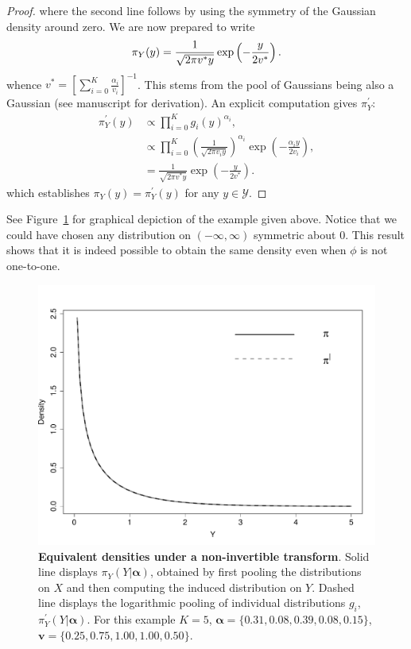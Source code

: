 \documentclass[a4paper, notitlepage, 10pt]{article}
\begin{document}
\begin{proof}
where the second line follows by using the symmetry of the Gaussian density around zero.
We are now prepared to write 
\begin{equation}
 \pi_Y(y) = \frac{1}{\sqrt{2\pi v^\ast y}} \exp\left(-\frac{y}{2v^\ast}\right). \\
\end{equation}
whence $v^\ast =  \left[\sum_{i=0}^K \frac{\alpha_i}{v_i} \right]^{-1}$.
This stems from the pool of Gaussians being also a Gaussian (see manuscript for derivation).
An explicit computation gives $\pi^{\prime}_{Y}$:
\begin{align}
 \pi^{\prime}_{Y}(y) &\propto \prod_{i=0}^K g_i(y)^{\alpha_i}, \\
 & \propto \prod_{i=0}^K \left( \frac{1}{\sqrt{2\pi v_i y}} \right)^{\alpha_i} \exp\left(-\frac{\alpha_i y}{2v_i}\right),\\
 &= \frac{1}{\sqrt{2\pi v^\ast y}} \exp\left(-\frac{y}{2v^\ast}\right).
\end{align}
which establishes $ \pi_{Y}(y) =  \pi^{\prime}_{Y}(y)$ for any $ y \in \mathcal{Y}$.
\end{proof}
See Figure~\ref{fig:normal_square_example} for graphical depiction of the example given above.
Notice that we could have chosen any distribution on $(-\infty, \infty)$ symmetric about $0$.
This result shows that it is indeed possible to obtain the same density even when $\phi$ is not one-to-one.

\begin{figure}[!ht]
\centering
\includegraphics[scale=0.5]{figures/normal_square_example.pdf}
\caption{\textbf{Equivalent densities under a non-invertible transform}. Solid line displays $\pi_Y(Y | \boldsymbol\alpha)$, obtained by first pooling the distributions on $X$ and then computing the induced distribution on $Y$.
Dashed line displays the logarithmic pooling of individual distributions $g_{i}$, $\pi_Y^{\prime}(Y | \boldsymbol\alpha)$.
For this example $K=5$, $\boldsymbol \alpha = \{0.31, 0.08, 0.39, 0.08, 0.15 \} $, $\boldsymbol v = \{ 0.25, 0.75, 1.00, 1.00, 0.50 \}$.
}
\label{fig:normal_square_example}
\end{figure}
\end{document}

